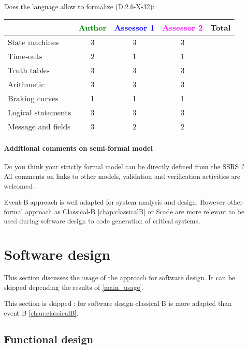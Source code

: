 Does the language allow to  formalize (D.2.6-X-32):

\begin{tabular}{|l | c | c | c | c|}
\hline
& \textcolor{green}{Author} & \textcolor{blue}{Assessor 1} & \textcolor{magenta}{Assessor 2} & Total \\
\hline 
State machines  & 3 & 3 & 3 &  \\
\hline
Time-outs  & 2 & 1 & 1 &  \\
\hline
Truth tables  & 3 & 3 & 3 &  \\
\hline
Arithmetic  & 3 & 3 & 3 &  \\
\hline
Braking curves  & 1 & 1 & 1 &  \\
\hline
Logical statements & 3 & 3 & 3 &  \\
\hline
Message and fields & 3 & 2 & 2 &  \\
\hline
\end{tabular}

\paragraph{Additional comments on semi-formal  model} Do you think your strictly formal  model can be directly defined from the SSRS ?
All comments on links to  other models, validation and verification activities are welcomed.


\begin{author_comment}
Event-B  approach is well adapted for system analysis and design. However other formal approach as Classical-B \ref{chap:classicalB} or Scade are more relevant to be used during software design to code generation of critical systems.
\end{author_comment}


\section{Software design}
This section discusses the usage of the approach for software design.
It can be skipped depending the results of \ref{main_usage}.


\begin{author_comment}
This section is skipped :  for software design classical B is more adapted than event B \ref{chap:classicalB}.
\end{author_comment}


\subsection{Functional design}


